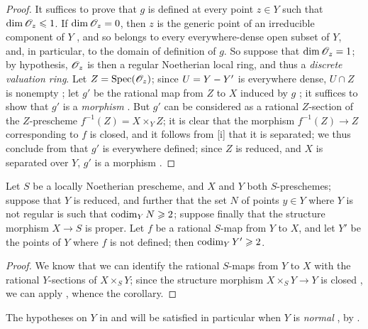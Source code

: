 \begin{proof}
It suffices to prove that $g$ is defined at every point $z\in Y$ such that $\dim\mathscr{O}_z\leqslant1$.
If $\dim\mathscr{O}_z=0$, then $z$ is the generic point of an irreducible component of $Y$ , and so belongs to every everywhere-dense open subset of $Y$, and, in particular, to the domain of definition of $g$.
So suppose that $\dim\mathscr{O}_z=1$; by hypothesis, $\mathscr{O}_z$ is then a regular Noetherian local ring, and thus  a \emph{discrete valuation ring}.
Let $Z=\operatorname{Spec}(\mathscr{O}_z)$;
since $U=Y- Y'$ is everywhere dense, $U\cap Z$ is nonempty ;
let $g'$ be the rational map from $Z$ to $X$ induced by $g$ ;
it suffices to show that $g'$ is a \emph{morphism} .
But $g'$ can be considered as a rational $Z$-section of the $Z$-prescheme $f^{-1}(Z)=X\times_Y Z$;
it is clear that the morphism $f^{-1}(Z)\to Z$ corresponding to $f$ is closed, and it follows from [i] that it is separated;
we thus conclude from  that $g'$ is everywhere defined;
since $Z$ is reduced, and $X$ is separated over $Y$, $g'$ is a morphism .
\end{proof}

\begin{corollary}[7.3.6]
\label{II.7.3.6}
Let $S$ be a locally Noetherian prescheme, and $X$ and $Y$ both $S$-preschemes;
suppose that $Y$ is reduced, and further that the set $N$ of points $y\in Y$ where $Y$ is not regular is such that $\operatorname{codim}_Y N\geqslant2$;
suppose finally that the structure morphism $X\to S$ is proper.
Let $f$ be a rational $S$-map from $Y$ to $X$, and let $Y'$ be the points of $Y$ where $f$ is not defined;
then $\operatorname{codim}_Y Y'\geqslant2$.
\end{corollary}

\begin{proof}
We know  that we can identify the rational $S$-maps from $Y$ to $X$ with the rational $Y$-sections of $X\times_S Y$;
since the structure morphism $X\times_S Y\to Y$ is closed , we can apply , whence the corollary.
\end{proof}

\begin{remark}[7.3.7]
\label{II.7.3.7}
The hypotheses on $Y$ in  and  will be satisfied in particular when $Y$ is \emph{normal} , by .
\end{remark}

